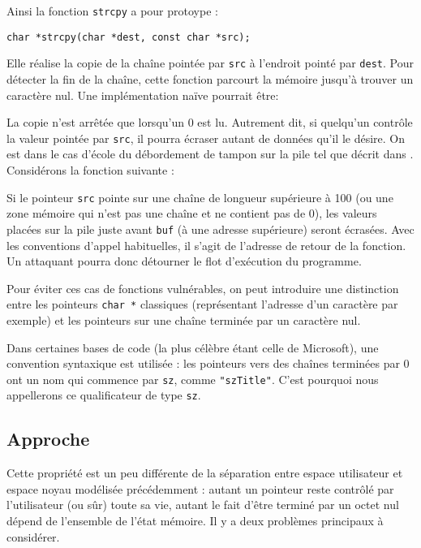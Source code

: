 Ainsi la fonction \texttt{strcpy} a pour protoype :

\begin{Verbatim}
char *strcpy(char *dest, const char *src);
\end{Verbatim}

Elle réalise la copie de la chaîne pointée par \texttt{src} à l'endroit pointé
par \texttt{dest}. Pour détecter la fin de la chaîne, cette fonction parcourt la
mémoire jusqu'à trouver un caractère nul. Une implémentation naïve pourrait être:


La copie n'est arrêtée que lorsqu'un 0 est lu. Autrement dit, si quelqu'un
contrôle la valeur pointée par \texttt{src}, il pourra écraser autant de données
qu'il le désire. On est dans le cas d'école du débordement de tampon sur la pile
tel que décrit dans \cite{SmashingTheStack}. Considérons la fonction suivante :


Si le pointeur \texttt{src} pointe sur une chaîne de longueur supérieure à 100
(ou une zone mémoire qui n'est pas une chaîne et ne contient pas de 0), les
valeurs placées sur la pile juste avant \texttt{buf} (à une adresse supérieure)
seront écrasées. Avec les conventions d'appel habituelles, il s'agit de
l'adresse de retour de la fonction. Un attaquant pourra donc détourner le flot
d'exécution du programme.

Pour éviter ces cas de fonctions vulnérables, on peut introduire une distinction
entre les pointeurs \texttt{char *} classiques (représentant l'adresse d'un
caractère par exemple) et les pointeurs sur une chaîne terminée par un caractère
nul.

Dans certaines bases de code (la plus célèbre étant celle de Microsoft), une
convention syntaxique est utilisée : les pointeurs vers des chaînes terminées
par 0 ont un nom qui commence par \texttt{sz}, comme \texttt{"szTitle"}. C'est
pourquoi nous appellerons ce qualificateur de type \texttt{sz}.

\subsection{Approche}

Cette propriété est un peu différente de la séparation entre espace utilisateur
et espace noyau modélisée précédemment : autant un pointeur reste contrôlé par
l'utilisateur (ou sûr) toute sa vie, autant le fait d'être terminé par un octet
nul dépend de l'ensemble de l'état mémoire. Il y a deux problèmes principaux à
considérer.

